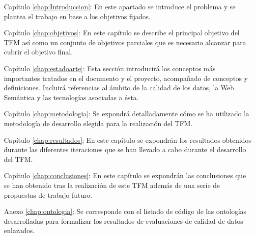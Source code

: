 \begin{definitionlist}
\item[Capítulo \ref{chap:Introduccion}: \nameref{chap:Introduccion}] En este
  apartado se introduce el problema y se plantea el trabajo en base a los
  objetivos fijados. 


\item[Capítulo \ref{chap:objetivos}: \nameref{chap:objetivos}] En este capítulo
  se describe el principal objetivo del \acs{TFM} así como un conjunto de
  objetivos parciales que es necesario alcanzar para cubrir el objetivo
  final. 

\item[Capítulo \ref{chap:estadoarte}: \nameref{chap:estadoarte}] Esta sección
  introducirá los conceptos más importantes tratados en el documento y el
  proyecto, acompañado de conceptos y definiciones. Incluirá referencias al
  ámbito de la calidad de los datos, la Web Semántica y las tecnologías
  asociadas a ésta. 

\item[Capítulo \ref{chap:metodologia}: \nameref{chap:metodologia}] Se expondrá
  detalladamente cómo se ha utilizado la metodología de desarrollo elegida para la realización del \acs{TFM}.

\item[Capítulo \ref{chap:resultados}: \nameref{chap:resultados}] En este
  capítulo se expondrán los resultados obtenidos durante las diferentes
  iteraciones que se han llevado a cabo durante el desarrollo del
  \acs{TFM}. 

\item[Capítulo \ref{chap:conclusiones}: \nameref{chap:conclusiones}] En este
  capítulo se expondrán las conclusiones que se han obtenido tras la realización
  de este \acs{TFM} además de una serie de propuestas de trabajo futuro. 

\item[Anexo \ref{chap:ontologia}: \nameref{chap:ontologia}] Se
  corresponde con el listado de código de las ontologías desarrolladas para formalizar
  los resultados de evaluaciones de calidad de datos enlazados. 

\end{definitionlist}




